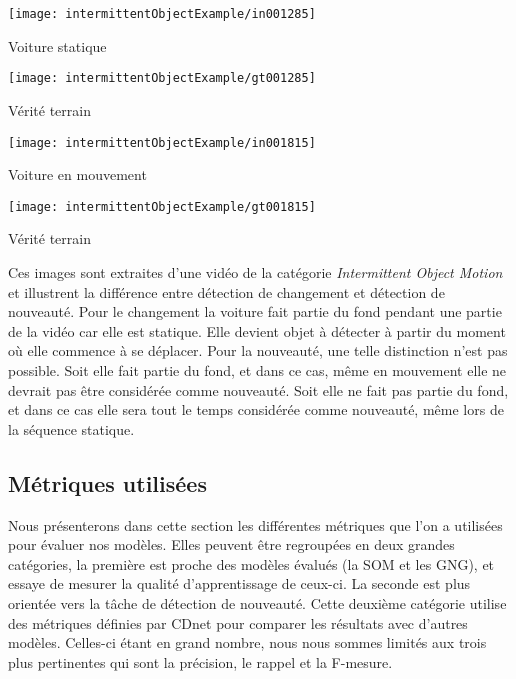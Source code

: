 	\begin{figureth}
		\begin{subfigureth}{0.24\textwidth}
			\texttt{[image: intermittentObjectExample/in001285]}\caption{Voiture statique}	
		\end{subfigureth}
		\begin{subfigureth}{0.24\textwidth}
			\texttt{[image: intermittentObjectExample/gt001285]}\caption{Vérité terrain}
		\end{subfigureth}
		\begin{subfigureth}{0.24\textwidth}
			\texttt{[image: intermittentObjectExample/in001815]}\caption{Voiture en mouvement}	
		\end{subfigureth}
		\begin{subfigureth}{0.24\textwidth}
			\texttt{[image: intermittentObjectExample/gt001815]}\caption{Vérité terrain}	
		\end{subfigureth}
		\caption[Différence entre nouveauté and changement]{Ces images sont extraites d'une vidéo de la catégorie \textit{Intermittent Object Motion} et illustrent la différence entre détection de changement et détection de nouveauté. Pour le changement la voiture fait partie du fond pendant une partie de la vidéo car elle est statique. Elle devient objet à détecter à partir du moment où elle commence à se déplacer. Pour la nouveauté, une telle distinction n'est pas possible. Soit elle fait partie du fond, et dans ce cas, même en mouvement elle ne devrait pas être considérée comme nouveauté. Soit elle ne fait pas partie du fond, et dans ce cas elle sera tout le temps considérée comme nouveauté, même lors de la séquence statique.}\label{fig:cdnet:diff}
	\end{figureth}

	\subsection{Métriques utilisées}

	Nous présenterons dans cette section les différentes métriques que l'on a utilisées pour évaluer nos modèles. Elles peuvent être regroupées en deux grandes catégories, la première est proche des modèles évalués (la SOM et les GNG), et essaye de mesurer la qualité d'apprentissage de ceux-ci. La seconde est plus orientée vers la tâche de détection de nouveauté. Cette deuxième catégorie utilise des métriques définies par CDnet pour comparer les résultats avec d'autres modèles. Celles-ci étant en grand nombre, nous nous sommes limités aux trois plus pertinentes qui sont la précision, le rappel et la F-mesure.

